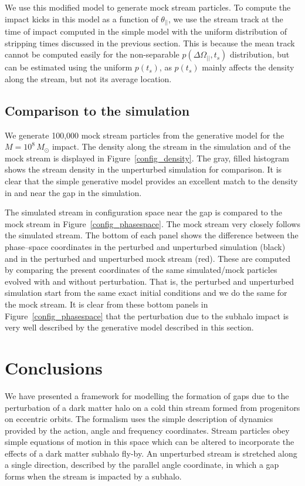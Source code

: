 \documentclass[useAMS,usenatbib,fleqn,a4paper]{mn2e}
\begin{document}
We use this modified model to generate mock stream particles. To compute the impact kicks in this model as a function of $\theta_{||}$, we use the stream track at the time of impact computed in the simple model with the uniform distribution of stripping times discussed in the previous section. This is because the mean track cannot be computed easily for the non-separable $p(\Delta\Omega_{||},t_s)$ distribution, but can be estimated using the uniform $p(t_s)$, as $p(t_s)$ mainly affects the density along the stream, but not its average location.

\subsection{Comparison to the simulation}

We generate 100,000 mock stream particles from the generative model
for the $M=10^8\,M_\odot$ impact. The density along the stream in the
simulation and of the mock stream is displayed in
Figure~\ref{config_density}. The gray, filled histogram shows the
stream density in the unperturbed simulation for comparison. It is
clear that the simple generative model provides an excellent match to
the density in and near the gap in the simulation.

The simulated stream in configuration space near the gap is compared
to the mock stream in Figure~\ref{config_phasespace}. The mock stream
very closely follows the simulated stream. The bottom of each panel
shows the difference between the phase--space coordinates in the
perturbed and unperturbed simulation (black) and in the perturbed and
unperturbed mock stream (red). These are computed by comparing the
present coordinates of the same simulated/mock particles evolved with
and without perturbation. That is, the perturbed and unperturbed
simulation start from the same exact initial conditions and we do the
same for the mock stream. It is clear from these bottom panels in
Figure~\ref{config_phasespace} that the perturbation due to the
subhalo impact is very well described by the generative model
described in this section.

\section{Conclusions}\label{Sect::Conclusions}
We have presented a framework for modelling the formation of gaps due to the perturbation of a dark matter halo on a cold thin stream formed from progenitors on eccentric orbits. The formalism uses the simple description of dynamics provided by the action, angle and frequency coordinates. Stream particles obey simple equations of motion in this space which can be altered to incorporate the effects of a dark matter subhalo fly-by. An unperturbed stream is stretched along a single direction, described by the parallel angle coordinate, in which a gap forms when the stream is impacted by a subhalo.
\end{document}
